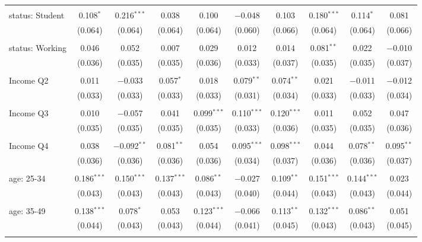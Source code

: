 \begin{tabular}{@{\extracolsep{5pt}}lccccccccc}
  & & & & & & & & & \\ 
 status: Student & 0.108$^{*}$ & 0.216$^{***}$ & 0.038 & 0.100 & $-$0.048 & 0.103 & 0.180$^{***}$ & 0.114$^{*}$ & 0.081 \\ 
  & (0.064) & (0.064) & (0.064) & (0.064) & (0.060) & (0.066) & (0.064) & (0.064) & (0.066) \\ 
  & & & & & & & & & \\ 
 status: Working & 0.046 & 0.052 & 0.007 & 0.029 & 0.012 & 0.014 & 0.081$^{**}$ & 0.022 & $-$0.010 \\ 
  & (0.036) & (0.035) & (0.035) & (0.036) & (0.033) & (0.037) & (0.035) & (0.035) & (0.037) \\ 
  & & & & & & & & & \\ 
 Income Q2 & 0.011 & $-$0.033 & 0.057$^{*}$ & 0.018 & 0.079$^{**}$ & 0.074$^{**}$ & 0.021 & $-$0.011 & $-$0.012 \\ 
  & (0.033) & (0.033) & (0.033) & (0.033) & (0.031) & (0.034) & (0.033) & (0.033) & (0.034) \\ 
  & & & & & & & & & \\ 
 Income Q3 & 0.010 & $-$0.057 & 0.041 & 0.099$^{***}$ & 0.110$^{***}$ & 0.120$^{***}$ & 0.011 & 0.052 & 0.047 \\ 
  & (0.035) & (0.035) & (0.035) & (0.035) & (0.033) & (0.036) & (0.035) & (0.035) & (0.036) \\ 
  & & & & & & & & & \\ 
 Income Q4 & 0.038 & $-$0.092$^{**}$ & 0.081$^{**}$ & 0.054 & 0.095$^{***}$ & 0.098$^{***}$ & 0.044 & 0.078$^{**}$ & 0.095$^{**}$ \\ 
  & (0.036) & (0.036) & (0.036) & (0.036) & (0.034) & (0.037) & (0.036) & (0.036) & (0.037) \\ 
  & & & & & & & & & \\ 
 age: 25-34 & 0.186$^{***}$ & 0.150$^{***}$ & 0.137$^{***}$ & 0.086$^{**}$ & $-$0.027 & 0.109$^{**}$ & 0.151$^{***}$ & 0.144$^{***}$ & 0.023 \\ 
  & (0.043) & (0.043) & (0.043) & (0.043) & (0.040) & (0.044) & (0.043) & (0.043) & (0.044) \\ 
  & & & & & & & & & \\ 
 age: 35-49 & 0.138$^{***}$ & 0.078$^{*}$ & 0.053 & 0.123$^{***}$ & $-$0.066 & 0.113$^{**}$ & 0.132$^{***}$ & 0.086$^{**}$ & 0.051 \\ 
  & (0.044) & (0.043) & (0.043) & (0.044) & (0.041) & (0.045) & (0.043) & (0.043) & (0.045) \\ 
  & & & & & & & & & \\ 

\end{tabular}
